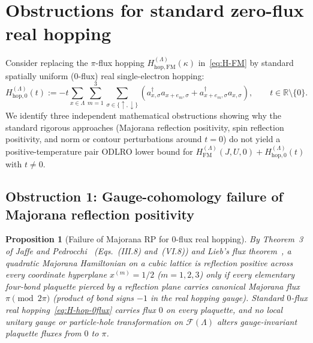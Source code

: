 \documentclass[11pt]{article}
\newtheorem{proposition}[theorem]{Proposition}
\theoremstyle{definition}
\theoremstyle{remark}
\newcommand{\calF}{\mathcal{F}}
\newcommand{\bbR}{\mathbb{R}}
\begin{document}
\section{Obstructions for standard zero-flux real hopping}\label{sec:obstructions}

Consider replacing the $\pi$-flux hopping $H_{\mathrm{hop},\mathrm{FM}}^{(\Lambda)}(\kappa)$ in~\eqref{eq:H-FM} by standard spatially uniform ($0$-flux) real single-electron hopping:
\begin{equation}\label{eq:H-hop-0flux}
H_{\mathrm{hop},0}^{(\Lambda)}(t) := -t \sum_{x \in \Lambda} \sum_{m=1}^3 \sum_{\sigma \in \{\uparrow,\downarrow\}} \left(a_{x,\sigma}^\dagger a_{x+e_m,\sigma} + a_{x+e_m,\sigma}^\dagger a_{x,\sigma}\right), \qquad t \in \bbR \setminus \{0\}.
\end{equation}
We identify three independent mathematical obstructions showing why the standard rigorous approaches (Majorana reflection positivity, spin reflection positivity, and norm or contour perturbations around $t = 0$) do not yield a positive-temperature pair ODLRO lower bound for $H_{\mathrm{FM}}^{(\Lambda)}(J, U, 0) + H_{\mathrm{hop},0}^{(\Lambda)}(t)$ with $t \ne 0$.

\subsection{Obstruction 1: Gauge-cohomology failure of Majorana reflection positivity}\label{subsec:obs1}

\begin{proposition}[Failure of Majorana RP for $0$-flux real hopping]\label{prop:obs-rp}
By Theorem~3 of Jaffe and Pedrocchi~\cite{jaffe2015a} (Eqs.~(III.8) and~(VI.8)) and Lieb's flux theorem~\cite{lieb1994,macris1996}, a quadratic Majorana Hamiltonian on a cubic lattice is reflection positive across every coordinate hyperplane $x^{(m)} = 1/2$ ($m=1,2,3$) only if every elementary four-bond plaquette pierced by a reflection plane carries canonical Majorana flux $\pi \pmod{2\pi}$ (product of bond signs $-1$ in the real hopping gauge). Standard $0$-flux real hopping~\eqref{eq:H-hop-0flux} carries flux $0$ on every plaquette, and no local unitary gauge or particle-hole transformation on $\calF(\Lambda)$ alters gauge-invariant plaquette fluxes from $0$ to $\pi$.
\end{proposition}
\end{document}
